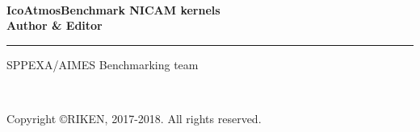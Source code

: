 \newpage
\thispagestyle{empty}

\mbox{\hspace*{1em}}\\

\vspace{10mm}
{\large{\bfseries IcoAtmosBenchmark NICAM kernels}}\\

\vspace{10mm}
{\large{\bfseries Author \& Editor}}\\
\hrule width 90mm
\begin{tabbing}
SPPEXA/AIMES Benchmarking team\\
\end{tabbing}


\vspace{110mm}

\begin{flushright}
\\
\end{flushright}

\vspace{10mm}

\begin{flushright}
Copyright \copyright RIKEN, 2017-2018. All rights reserved.
\end{flushright}

